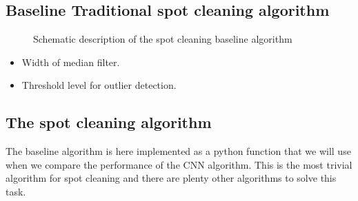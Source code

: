 \documentclass[letterpaper,10pt,english]{sphinxmanual}
\begin{document}
\subsection{Baseline \sphinxhyphen{} Traditional spot cleaning algorithm}
\label{\detokenize{ML4NeutronImageSegmentation:baseline-traditional-spot-cleaning-algorithm}}
\begin{figure}[htbp]
\centering
\capstart

\noindent{}
\caption{Schematic description of the spot cleaning baseline algorithm}\label{\detokenize{ML4NeutronImageSegmentation:id18}}\end{figure}



\begin{itemize}
\item {} 
 Width of median filter.

\item {} 
 Threshold level for outlier detection.

\end{itemize}


\subsection{The spot cleaning algorithm}
\label{\detokenize{ML4NeutronImageSegmentation:the-spot-cleaning-algorithm}}
The baseline algorithm is here implemented as a python function that we will use when we compare the performance of the CNN algorithm. This is the most trivial algorithm for spot cleaning and there are plenty other algorithms to solve this task.

\begin{sphinxVerbatim}[commandchars=\\\{\}]
   \PYG{p}{[}\PYG{p}{]} 
      
        
            
     
\end{sphinxVerbatim}
\end{document}
